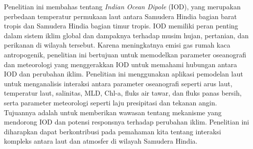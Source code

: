\begin{spacing}{1.5}
	\pagestyle{empty}
	\begin{center}
		\vskip 1cm
		\justifying
		Penelitian ini membahas tentang \textit{Indian Ocean Dipole} (IOD), yang merupakan perbedaan temperatur permukaan laut antara Samudera Hindia bagian barat tropis dan Samudera Hindia bagian timur tropis. IOD memiliki peran penting dalam sistem iklim global dan dampaknya terhadap musim hujan, pertanian, dan perikanan di wilayah tersebut. Karena meningkatnya emisi gas rumah kaca antropogenik, penelitian ini bertujuan untuk memodelkan parameter oseanografi dan meteorologi yang menggerakkan IOD untuk memahami hubungan antara IOD dan perubahan iklim. Penelitian ini menggunakan aplikasi pemodelan laut untuk menganalisis interaksi antara parameter oseanografi seperti arus laut, temperatur laut, salinitas, MLD, Chl-a, fluks air tawar, dan fluks panas bersih, serta parameter meteorologi seperti laju presipitasi dan tekanan angin. Tujuannya adalah untuk memberikan wawasan tentang mekanisme yang mendorong IOD dan potensi responsnya terhadap perubahan iklim. Penelitian ini diharapkan dapat berkontribusi pada pemahaman kita tentang interaksi kompleks antara laut dan atmosfer di wilayah Samudera Hindia.
	\end{center}
\end{spacing}
\pagestyle{empty}